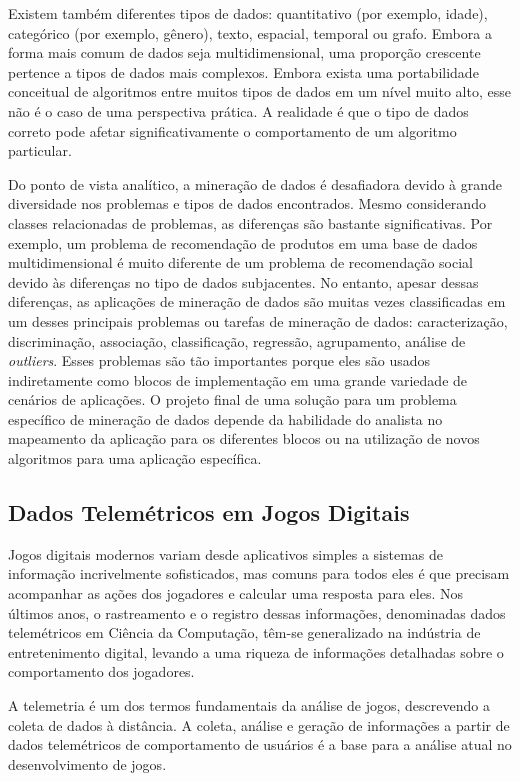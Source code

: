 Existem também diferentes tipos de dados: quantitativo (por exemplo, idade), categórico (por exemplo, gênero), texto, espacial, temporal ou grafo. Embora a forma mais comum de dados seja multidimensional, uma proporção crescente pertence a tipos de dados mais complexos. Embora exista uma portabilidade conceitual de algoritmos entre muitos tipos de dados em um nível muito alto, esse não é o caso de uma perspectiva prática. A realidade é que o tipo de dados correto pode afetar significativamente o comportamento de um algoritmo particular.

Do ponto de vista analítico, a mineração de dados é desafiadora devido à grande diversidade nos problemas e tipos de dados encontrados. Mesmo considerando classes relacionadas de problemas, as diferenças são bastante significativas. Por exemplo, um problema de recomendação de produtos em uma base de dados multidimensional é muito diferente de um problema de recomendação social devido às diferenças no tipo de dados subjacentes. No entanto, apesar dessas diferenças, as aplicações de mineração de dados são muitas vezes classificadas em um desses principais problemas ou tarefas de mineração de dados: caracterização, discriminação, associação, classificação, regressão, agrupamento, análise de \textit{outliers}. Esses problemas são tão importantes porque eles são usados indiretamente como blocos de implementação em uma grande variedade de cenários de aplicações. O projeto final de uma solução para um problema específico de mineração de dados depende da habilidade do analista no mapeamento da aplicação para os diferentes blocos ou na utilização de novos algoritmos para uma aplicação específica.

\subsection{Dados Telemétricos em Jogos Digitais}
Jogos digitais modernos variam desde aplicativos simples a sistemas de informação incrivelmente sofisticados, mas comuns para todos eles é que precisam acompanhar as ações dos jogadores e calcular uma resposta para eles. Nos últimos anos, o rastreamento e o registro dessas informações, denominadas dados telemétricos em Ciência da Computação, têm-se generalizado na indústria de entretenimento digital, levando a uma riqueza de informações detalhadas sobre o comportamento dos jogadores.

A telemetria é um dos termos fundamentais da análise de jogos, descrevendo a coleta de dados à distância. A coleta, análise e geração de informações a partir de dados telemétricos de comportamento de usuários é a base para a análise atual no desenvolvimento de jogos.

